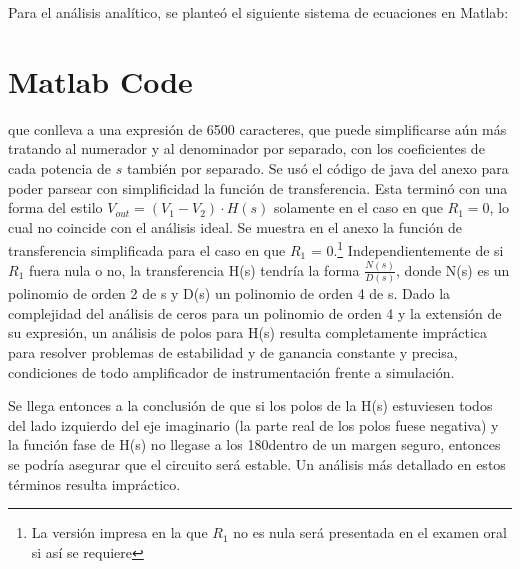 \documentclass[../../tc_tp3_main.tex]{subfiles}
\begin{document}
 Para el análisis analítico, se planteó el siguiente sistema de ecuaciones en Matlab: 
 


\section*{Matlab Code}



que conlleva a una expresión de 6500 caracteres, que puede simplificarse aún más tratando al numerador y al denominador por separado, con los coeficientes de cada potencia de $s$ también por separado. Se usó el código de java del anexo para poder parsear con simplificidad la función de transferencia. Esta terminó con una forma del estilo $V_{out} = (V_1 - V_2)\cdot H(s)$ solamente en el caso en que $R_1 = 0$, lo cual no coincide con el análisis ideal. Se muestra en el anexo la función de transferencia simplificada para el caso en que $R_1$ = 0.\footnote{La versión impresa en la que $R_1$ no es nula será presentada en el examen oral si así se requiere} Independientemente de si $R_1$ fuera nula o no, la transferencia H(s) tendría la forma $\frac{N(s)}{D(s)}$, donde N(s) es un polinomio de orden 2 de s y D(s) un polinomio de orden 4 de s. Dado la complejidad del análisis de ceros para un polinomio de orden 4 y la extensión de su expresión, un análisis de polos para H(s) resulta completamente impráctica para resolver problemas de estabilidad y de ganancia constante y precisa, condiciones de todo amplificador de instrumentación frente a simulación. \par
Se llega entonces a la conclusión de que si los polos de la H(s) estuviesen todos del lado izquierdo del eje imaginario (la parte real de los polos fuese negativa) y la función fase de H(s) no llegase a los 180\textdegree dentro de un margen seguro, entonces se podría asegurar que el circuito será estable. Un análisis más detallado en estos términos resulta impráctico.\par
\end{document}
